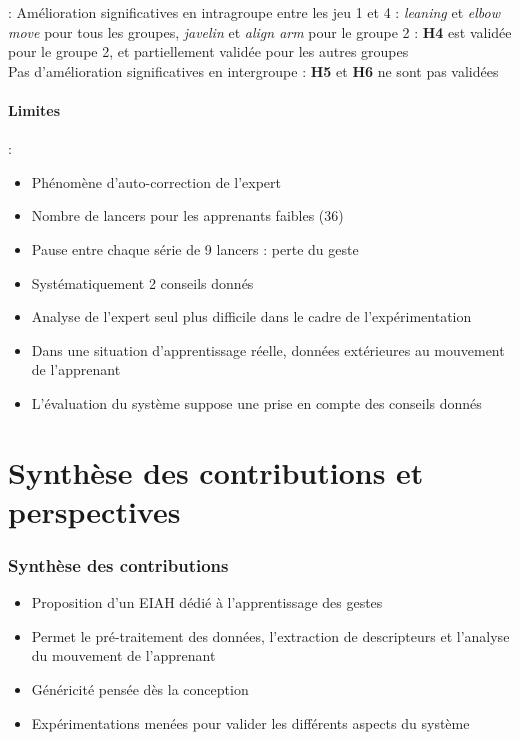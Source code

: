 \documentclass[svgnames]{beamer}
\begin{document}
	\begin{frame}{\secname : \subsecname}
		Amélioration significatives en intragroupe entre les jeu 1 et 4 : \textit{leaning} et \textit{elbow move} pour tous les groupes, \textit{javelin} et \textit{align arm} pour le groupe 2 : \textbf{H4} est validée pour le groupe 2, et partiellement validée pour les autres groupes\\
		\vspace{1cm}
		Pas d'amélioration significatives en intergroupe : \textbf{H5} et \textbf{H6} ne sont pas validées
		
	\end{frame}
	
	\subsection{Limites}
	\begin{frame}{\secname : \subsecname}
		\begin{itemize}[label=$\bullet$]
			\item Phénomène d'auto-correction de l'expert
			\item Nombre de lancers pour les apprenants faibles (36)
			\item Pause entre chaque série de 9 lancers : perte du geste
			\item Systématiquement 2 conseils donnés
			\item Analyse de l'expert seul plus difficile dans le cadre de l'expérimentation
			\item Dans une situation d'apprentissage réelle, données extérieures au mouvement de l'apprenant
			\item L'évaluation du système suppose une prise en compte des conseils donnés
		\end{itemize}
	\end{frame}
	
	\part{Synthèse des contributions et perspectives}
	\section{Synthèse des contributions}
	
	\begin{frame}{\secname}
		\begin{itemize}[label=$\bullet$]
			\item Proposition d'un EIAH dédié à l'apprentissage des gestes
			\item Permet le pré-traitement des données, l'extraction de descripteurs et l'analyse du mouvement de l'apprenant
			\item Généricité pensée dès la conception
			\item Expérimentations menées pour valider les différents aspects du système
		\end{itemize}
	\end{frame}
	
\end{document}
